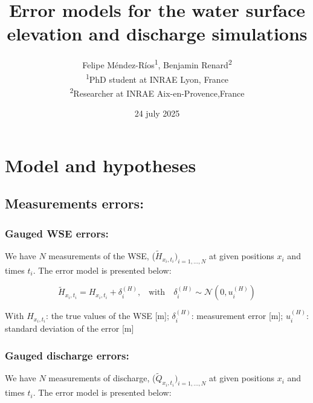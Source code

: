 \documentclass[12pt]{article}
\begin{document}
\setlength{\parskip}{10pt}
\setlength{\parindent}{0pt}

\title{Error models for the water surface elevation and discharge simulations}
\author{Felipe Méndez-Ríos\textsuperscript{1}, Benjamin Renard\textsuperscript{2} \\ 
\textsuperscript{1}PhD student at INRAE Lyon, France \\
\textsuperscript{2}Researcher at INRAE Aix-en-Provence,France \\
} 
\date{24 july 2025}
\maketitle

\section{\textbf{Model and hypotheses}}

\subsection{\textbf{Measurements errors:}}

\subsubsection{\textbf{Gauged WSE errors:}}

We have \(N\) measurements of the WSE, (\(\tilde{H}_{x_i,t_i})_{i=1,\ldots,N}\) at given positions \(x_i\)  and times \(t_i\). The error model is presented below:

\begin{equation}
    \tilde{H}_{x_i,t_i} = H_{x_i,t_i} + \delta_i^{(H)} \text{,} \quad \text{with} \quad    \delta_i^{(H)} \sim \mathcal{N}\left(0, u_i^{(H)}\right)
\end{equation}

With \( H_{x_i,t_i} \): the true values of the WSE [\si{\meter}];
\(\delta_i^{(H)}\): measurement error [\si{\meter}];
\(u_i^{(H)}\): standard deviation of the error [\si{\meter}]

\subsubsection{\textbf{Gauged discharge errors:}}

We have \(N\) measurements of discharge, (\(\tilde{Q}_{x_i,t_i})_{i=1,\ldots,N}\) at given positions \(x_i\)  and times \(t_i\). The error model is presented below:
\end{document}
